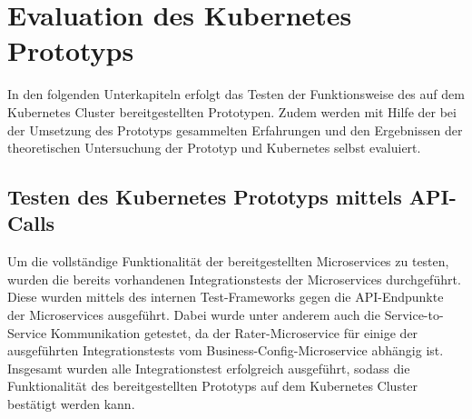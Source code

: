 \chapter{Evaluation des Kubernetes Prototyps}
\label{Evaluation_K8s}
In den folgenden Unterkapiteln erfolgt das Testen der Funktionsweise des auf dem Kubernetes Cluster bereitgestellten Prototypen. Zudem werden mit Hilfe der bei der Umsetzung des Prototyps gesammelten Erfahrungen und den Ergebnissen der theoretischen Untersuchung der Prototyp und Kubernetes selbst evaluiert.
\section{Testen des Kubernetes Prototyps mittels API-Calls}
Um die vollständige Funktionalität der bereitgestellten Microservices zu testen, wurden die bereits vorhandenen Integrationstests der Microservices durchgeführt. Diese wurden mittels des internen Test-Frameworks gegen die \ac{API}-Endpunkte der Microservices ausgeführt. Dabei wurde unter anderem auch die Service-to-Service Kommunikation getestet, da der Rater-Microservice für einige der ausgeführten Integrationstests vom Business-Config-Microservice abhängig ist.\\
Insgesamt wurden alle Integrationstest erfolgreich ausgeführt, sodass die Funktionalität des bereitgestellten Prototyps auf dem Kubernetes Cluster bestätigt werden kann.
